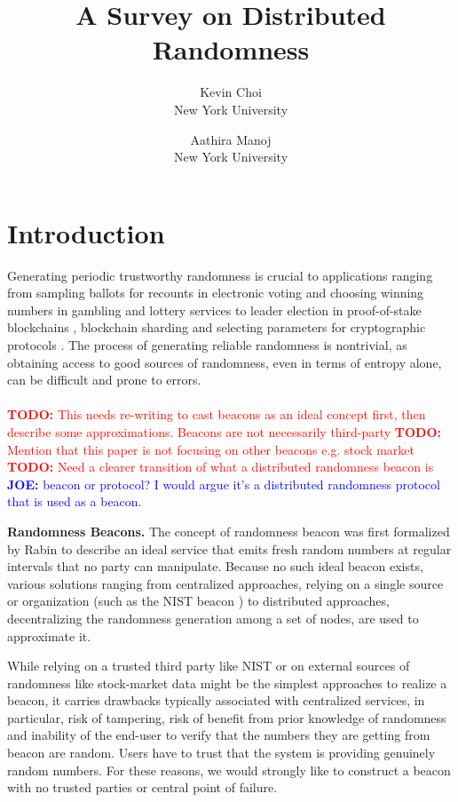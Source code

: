 \documentclass[letterpaper,twocolumn,10pt]{article}
\title{\Large \bf A Survey on Distributed Randomness}
\author{
{\rm Kevin Choi}\\
New York University
\and
{\rm Aathira Manoj}\\
New York University
}
\theoremstyle{definition}
\theoremstyle{remark}
\newcommand{\todo}[1]{\textcolor{red}{\textbf{TODO:} #1}}
\newcommand{\joenote}[1]{\textcolor{blue}{\textbf{JOE:} #1}}
\begin{document}
\maketitle
\tableofcontents

\section{Introduction}
Generating periodic trustworthy randomness is crucial to applications ranging from sampling ballots for recounts in electronic voting \cite{adida2008helios} and choosing winning numbers in gambling and lottery services \cite{bonneau2015bitcoin} to leader election in proof-of-stake blockchains \cite{gilad2017algorand, kiayias2017ouroboros}, blockchain sharding \cite{al2017chainspace, kokoris2018omniledger, luu2016secure} and selecting parameters for cryptographic protocols \cite{baigneres2015trap, lenstra2015random}. The process of generating reliable randomness is nontrivial, as obtaining access to good sources of randomness, even in terms of entropy alone, can be difficult and prone to errors. \\\\
\todo{This needs re-writing to cast beacons as an ideal concept first, then describe some approximations. Beacons are not necessarily third-party}
\todo{Mention that this paper is not focusing on other beacons e.g. stock market}
\todo{Need a clearer transition of what a distributed randomness beacon is} \joenote{beacon or protocol? I would argue it's a distributed randomness protocol that is used as a beacon.}

\textbf{Randomness Beacons.} The concept of randomness beacon was first formalized by Rabin \cite{rabin1983Rabin} to describe an ideal service that emits fresh random numbers at regular intervals that no party can manipulate. Because no such ideal beacon exists, various solutions ranging from  centralized approaches, relying on a single source or organization (such as the NIST beacon \cite{fischer2011public}) to distributed approaches, decentralizing the randomness generation among a set of nodes, are used to approximate it. 

While relying on a trusted third party like NIST or on external sources of randomness like stock-market data \cite{clark2010use} might be the simplest approaches to realize a beacon, it carries drawbacks typically associated with centralized services, in particular, risk of tampering, risk of benefit from prior knowledge of randomness and inability of the end-user to verify that the numbers they are getting from beacon are random. Users have to trust that the system is providing genuinely random numbers. For these reasons, we would strongly like to construct a beacon with no trusted parties or central point of failure. 
\end{document}
